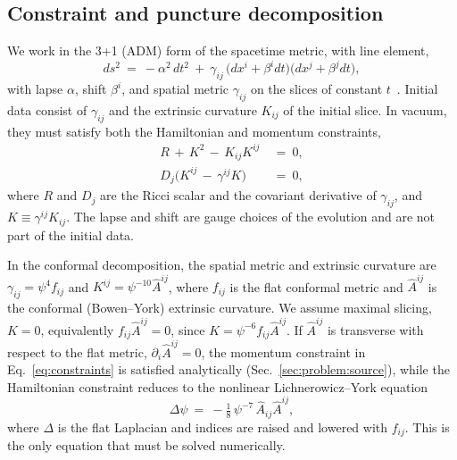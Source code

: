 \documentclass[
  aps,
  prd,
  twocolumn,
  10pt,
  amsmath,
  amssymb,
  nofootinbib,
  superscriptaddress,
  floatfix,
]{revtex4-2}
\newcommand{\Ahat}{\hat{A}}
\begin{document}
\subsection{Constraint and puncture decomposition}
\label{sec:problem:decomp}

We work in the 3+1 (ADM) form of the spacetime metric, with line element,
\begin{equation}
  ds^2 \ = \ -\alpha^2\,dt^2 \ + \ \gamma_{ij}\,\big(dx^i+\beta^i dt\big)\big(dx^j+\beta^j dt\big),
  \label{eq:adm_metric}
\end{equation}
with lapse $\alpha$, shift $\beta^i$, and spatial metric $\gamma_{ij}$ on the slices of constant $t$~\cite{BaumgarteShapiro2010}.
Initial data consist of $\gamma_{ij}$ and the extrinsic curvature $K_{ij}$ of the initial slice.
In vacuum, they must satisfy both the Hamiltonian and momentum constraints,
\begin{equation}
  \begin{aligned}
  R \, + \, K^2 \, - \, K_{ij}K^{ij}       \ &= \ 0, \\
  D_j\big(K^{ij} \, - \, \gamma^{ij}K\big) \ &= \ 0,
  \label{eq:constraints}
  \end{aligned}
\end{equation}
where $R$ and $D_j$ are the Ricci scalar and the covariant derivative of $\gamma_{ij}$, and $K\equiv\gamma^{ij}K_{ij}$.
The lapse and shift are gauge choices of the evolution and are not part of the initial data.

In the conformal decomposition, the spatial metric and extrinsic curvature are
$\gamma_{ij} = \psi^4 f_{ij}$ and $K^{ij} = \psi^{-10}\Ahat^{ij}$, where
$f_{ij}$ is the flat conformal metric and $\Ahat^{ij}$ is the conformal
(Bowen--York) extrinsic curvature. We assume maximal slicing,
$K=0$, equivalently $f_{ij}\Ahat^{ij}=0$, since
$K=\psi^{-6}f_{ij}\Ahat^{ij}$. If $\Ahat^{ij}$ is transverse with respect to the flat
metric, $\partial_i\Ahat^{ij}=0$, the momentum constraint in Eq.~\eqref{eq:constraints} is satisfied
analytically (Sec.~\ref{sec:problem:source}), while the Hamiltonian constraint
reduces to the non\-linear Lichnerowicz--York equation
\begin{equation}
  \Delta \psi \ = \ -\tfrac{1}{8}\, \psi^{-7}\, \Ahat_{ij}\Ahat^{ij},
  \label{eq:lichnerowicz}
\end{equation}
where $\Delta$ is the flat Laplacian and indices are raised and lowered with
$f_{ij}$. This is the only equation that must be solved numerically.
\end{document}
